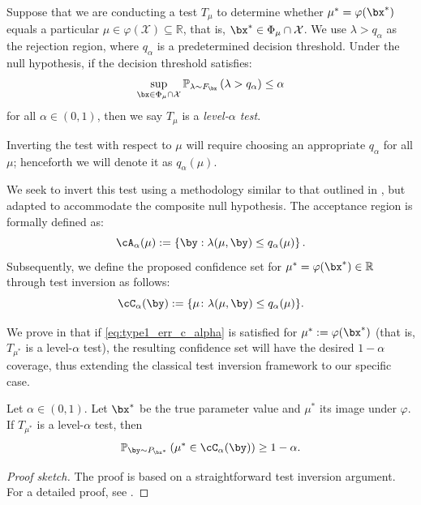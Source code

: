 \documentclass[11pt]{article}
\numberwithin{equation}{section}
\numberwithin{figure}{section}
\begin{document}
Suppose that we are conducting a test $T_\mu$ to determine whether $\mu^* = \varphi(\bx^*)$ equals a particular $\mu \in \varphi(\mathcal X) \subseteq \mathbb{R}$, that is, $\bx^* \in \Phi_{\mu} \cap \mathcal{X}$.
We use $\lambda > q_\alpha$ as the rejection region, where $q_\alpha$ is a predetermined decision threshold. 
Under the null hypothesis, if the decision threshold satisfies:
\begin{equation} \label{eq:type1_err_c_alpha}
    \sup_{\bx \in \Phi_{\mu} \cap \mathcal{X}} \mathbb{P}_{\lambda \sim F_{\bx}} \left(\lambda > q_\alpha \right) \leq \alpha
\end{equation}
for all $\alpha \in (0, 1)$, then we say $T_\mu$ is a \emph{level-$\alpha$ test}.\footnotemark
{}

Inverting the test with respect to $\mu$ will require choosing an appropriate $q_\alpha$ for all $\mu$; henceforth we will denote it as $q_\alpha(\mu)$. 

We seek to invert this test using a methodology similar to that outlined in , but adapted to accommodate the composite null hypothesis.
The acceptance region is formally defined as:
\begin{equation} \label{eq:acceptance_region_c_alpha}
    \cA_\alpha(\mu) := \left\{ \by: \lambda(\mu, \by) \leq q_\alpha(\mu) \right\}.
\end{equation}
Subsequently, we define the proposed confidence set for $\mu^* = \varphi(\bx^*) \in \mathbb{R}$ through test inversion as follows:
\begin{equation}\label{eq:conf_set_def}
    \cC_\alpha(\by) := \{ \mu \colon \lambda(\mu, \by) \leq q_\alpha(\mu) \}.
\end{equation}

We prove in  that if \eqref{eq:type1_err_c_alpha} is satisfied for $\mu^* := \varphi(\bx^*)$ (that is, $T_{\mu^*}$ is a level-$\alpha$ test), the resulting confidence set will have the desired $1 - \alpha$ coverage, thus extending the classical test inversion framework to our specific case.

\begin{lemma} \label{lem:conf_set_coverage}
Let $\alpha \in (0, 1)$.
Let $\bx^*$ be the true parameter value and $\mu^*$ its image under $\varphi$. 
If $T_{\mu^*}$ is a level-$\alpha$ test, then 
\[
\mathbb{P}_{\by \sim P_{\bx^*}} \left( \mu^* \in \cC_\alpha(\by) \right) \geq 1 - \alpha.
\]
\end{lemma}
\begin{proof}[Proof sketch]
    The proof is based on a straightforward test inversion argument.
    For a detailed proof, see .
\end{proof}
\end{document}
